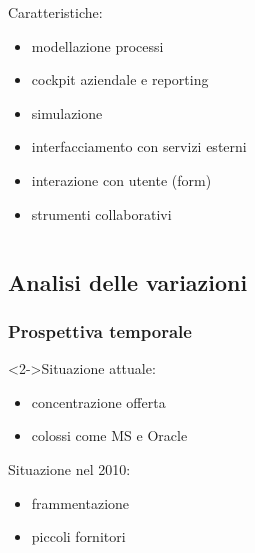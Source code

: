 \documentclass[compress,9pt]{beamer}
\begin{document}
\begin{frame}
\begin{columns}
{\begin{block}{Caratteristiche:}
\begin{itemize}
  \item modellazione processi
  \item cockpit aziendale e reporting
  \item simulazione
  \item interfacciamento con servizi esterni
  \item interazione con utente (form)
  \item strumenti collaborativi
\end{itemize}
\end{block}
}
\end{columns}
\end{frame}

\subsection{Analisi delle variazioni}
\begin{frame}%
\frametitle{Prospettiva temporale}
\hfill\begin{minipage}[b]{.4\textwidth}
\begin{block}<2->{Situazione attuale:}
\begin{itemize}
  \item concentrazione offerta
  \item colossi come MS e Oracle
\end{itemize}
\end{block}
\end{minipage}


\begin{minipage}[b]{.4\textwidth}
\begin{block}{Situazione nel 2010:}
\begin{itemize}
  \item frammentazione
  \item piccoli fornitori
\end{itemize}
\end{block}
\end{minipage}
\end{frame}
\end{document}
